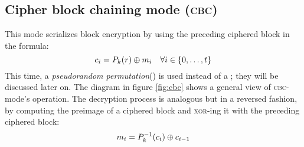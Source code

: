 \subsection{Cipher block chaining mode (\textsc{cbc})}

This mode serializes block encryption by using the preceding ciphered block in the formula:
\[
    c_i = P_k(r) \oplus m_i \quad \forall i \in \{0, \dots, t\}
\]
This time, a \emph{pseudorandom permutation}(\prp) is used instead of a \prf; they will be discussed later on. The diagram in figure \ref{fig:cbc} shows a general view of \textsc{cbc}-mode's operation. The decryption process is analogous but in a reversed fashion, by computing the preimage of a ciphered block and \textsc{xor}-ing it with the preceding ciphered block:
\[
    m_i = P_k^{-1}(c_i) \oplus c_{i-1}
\]

